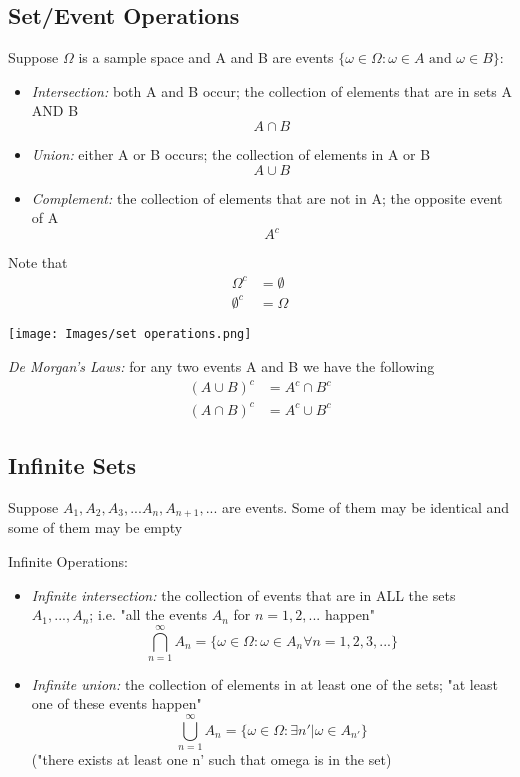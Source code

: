 \documentclass[12pt]{article}
\begin{document}
\subsection*{Set/Event Operations}
Suppose $\Omega$ is a sample space and A and B are events $\{\omega \in \Omega : \omega \in A \text{ and } \omega \in B\}$:
\begin{itemize}
    \item \emph{Intersection:} both A and B occur; the collection of elements that are in sets A AND B 
    \[A \cap B \]
    \item \emph{Union:} either A or B occurs; the collection of elements in A or B
    \[A \cup  B\]
    \item \emph{Complement:} the collection of elements that are not in A; the opposite event of A 
    \[A^c\]
\end{itemize}
Note that 
\begin{align*}
    \Omega^c &= \emptyset\\
    \emptyset^c &= \Omega
\end{align*}
\begin{center}
    \texttt{[image: Images/set operations.png]}
\end{center}

\emph{De Morgan's Laws:} for any two events A and B we have the following
\begin{align}
    (A \cup B)^c &= A^c \cap B^c\\
    (A \cap B)^c &= A^c \cup B^c
\end{align}

\subsection*{Infinite Sets}
Suppose $A_1, A_2, A_3, ... A_n, A_{n + 1}, ...$ are events. Some of them may be identical and some of them may be empty

Infinite Operations:
\begin{itemize}
    \item \emph{Infinite intersection:} the collection of events that are in ALL the sets $A_1, ..., A_n$; i.e. "all the events $A_n$ for $n = 1, 2, ...$ happen"
    \[\bigcap_{n=1}^\infty A_n = \{\omega \in \Omega : \omega \in A_n \forall n = 1, 2, 3, ...\}\]
    
    \item \emph{Infinite union:} the collection of elements in at least one of the sets; "at least one of these events happen"
    \[\bigcup_{n=1}^\infty A_n = \{\omega \in \Omega : \exists n' | \omega \in A_{n'}\}\]
    ("there exists at least one n' such that omega is in the set)
\end{itemize}
\end{document}

